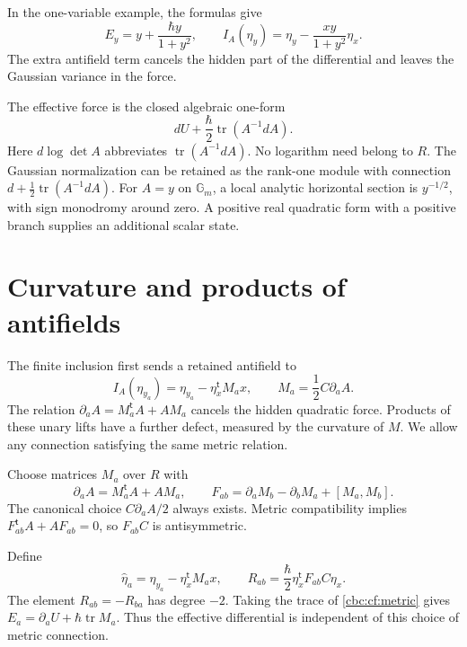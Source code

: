 In the one-variable example, the formulas give
\[
 E_y=y+\frac{\hbar y}{1+y^2},\qquad
 I_A(\eta_y)=\eta_y-\frac{xy}{1+y^2}\eta_x.
\]
The extra antifield term cancels the hidden part of the
differential and leaves the Gaussian variance in the force.

The effective force is the closed algebraic one-form
\[
 dU+\frac{\hbar}{2}\operatorname{tr}(A^{-1}dA).
\]
Here $d\log\det A$ abbreviates
$\operatorname{tr}(A^{-1}dA)$. No logarithm need belong to $R$.
The Gaussian normalization can be retained as the rank-one
module with connection
$d+\tfrac12\operatorname{tr}(A^{-1}dA)$.
For $A=y$ on $\mathbb G_m$, a local analytic horizontal
section is $y^{-1/2}$, with sign monodromy around zero.
A positive real quadratic form with a positive branch supplies
an additional scalar state.

\section{Curvature and products of antifields}
\label{cbc:cf:curvature}

The finite inclusion first sends a retained antifield to
\[
 I_A(\eta_{y_a})=\eta_{y_a}-\eta_x^{\mathsf t}M_ax,
 \qquad M_a=\frac12C\partial_aA.
\]
The relation $\partial_aA=M_a^{\mathsf t}A+AM_a$ cancels
the hidden quadratic force. Products of these unary lifts
have a further defect, measured by the curvature of $M$.
We allow any connection satisfying the same metric relation.

Choose matrices $M_a$ over $R$ with
\begin{equation}\label{cbc:cf:metric}
 \partial_aA=M_a^{\mathsf t}A+AM_a,\qquad
 F_{ab}=\partial_aM_b-\partial_bM_a+[M_a,M_b].
\end{equation}
The canonical choice $C\partial_aA/2$ always exists.
Metric compatibility implies
$F_{ab}^{\mathsf t}A+AF_{ab}=0$, so $F_{ab}C$
is antisymmetric.

Define
\begin{equation}\label{cbc:cf:hats}
 \widehat\eta_a=\eta_{y_a}-\eta_x^{\mathsf t}M_ax,\qquad
 R_{ab}=\frac{\hbar}{2}\eta_x^{\mathsf t}F_{ab}C\eta_x.
\end{equation}
The element $R_{ab}=-R_{ba}$ has degree $-2$. Taking the
trace of \eqref{cbc:cf:metric} gives
$E_a=\partial_aU+\hbar\operatorname{tr}M_a$.
Thus the effective differential is independent of this choice
of metric connection.

